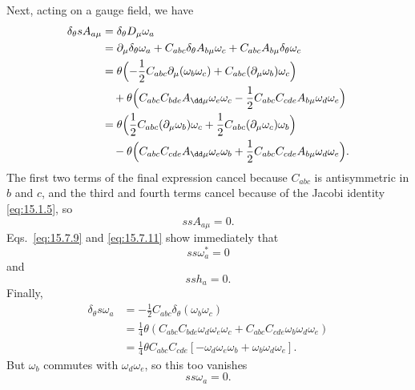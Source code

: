 Next, acting on a gauge field, we have
\begin{align*}
 \delta_\theta sA_{a\mu}
 &=\delta_\theta D_\mu\omega_a\\
 &=\partial_\mu\delta_\theta\omega_a
 +C_{abc}\delta_\theta A_{b\mu}\omega_c
 +C_{abc}A_{b\mu}\delta_\theta\omega_c\\
 &=\theta\Bigl(-\frac{1}{2}C_{abc}
 \partial_\mu(\omega_b\omega_c)
 +C_{abc}(\partial_\mu\omega_b)\omega_c\Bigr)\\
 &\quad+\theta\Bigl(
 C_{abc}C_{bde}
 A_{\dd\mu}\omega_e\omega_c
 -\frac{1}{2}C_{abc}C_{cde}
 A_{b\mu}\omega_d\omega_e\Bigr)\\
 &=\theta\Bigl(\frac{1}{2}C_{abc}
 (\partial_\mu\omega_b)\omega_c
 +\frac{1}{2}C_{abc}
 (\partial_\mu\omega_c)\omega_b\Bigr)\\
 &\quad-\theta\Bigl(
 C_{abc}C_{cde}
 A_{\dd\mu}\omega_e\omega_b
 +\frac{1}{2}C_{abc}C_{cde}
 A_{b\mu}\omega_d\omega_e\Bigr).
\end{align*}
The first two terms of the final expression cancel because $C_{abc}$ is antisymmetric in $b$ and $c$, and the third and fourth terms cancel because of the Jacobi identity \eqref{eq:15.1.5}, so
\begin{equation}
 ssA_{a\mu}=0.
 \tag{15.7.16}\label{eq:15.7.16}
\end{equation}
Eqs.~\eqref{eq:15.7.9} and \eqref{eq:15.7.11} show immediately that
\begin{equation}
 ss\omega_a^*=0
 \tag{15.7.17}\label{eq:15.7.17}
\end{equation}
and
\begin{equation}
 ssh_a=0.
 \tag{15.7.18}\label{eq:15.7.18}
\end{equation}
Finally,
\begin{align*}
 \delta_\theta s\omega_a
 &=-\frac{1}{2}C_{abc}\delta_\theta(\omega_b\omega_c)\\
 &=\frac{1}{4}\theta\left(C_{abc}C_{bde}\omega_d\omega_e\omega_c
 +C_{abc}C_{cde}\omega_b\omega_d\omega_e\right)\\
 &=\frac{1}{4}\theta C_{abc}C_{cde}
 \left[-\omega_d\omega_e\omega_b+\omega_b\omega_d\omega_e\right].
\end{align*}
But $\omega_b$ commutes with $\omega_d\omega_e$, so this too vanishes
\begin{equation}
 ss\omega_a=0.
 \tag{15.7.19}\label{eq:15.7.19}
\end{equation}

